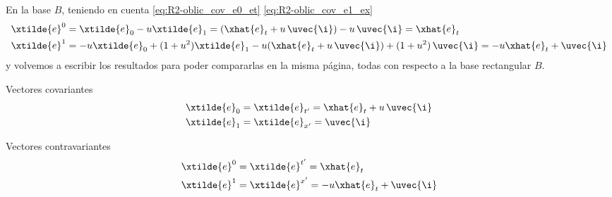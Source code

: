 En la base $B$, teniendo en cuenta \eqref{eq:R2-oblic_cov_e0_et}
\eqref{eq:R2-oblic_cov_e1_ex}
\begin{align}
  \xtilde{e}^0
  &=
    \xtilde{e}_0 - u\xtilde{e}_1
    = (\xhat{e}_t + u\,\uvec{\i}) - u\,\uvec{\i}
    = \xhat{e}_t\\
  \xtilde{e}^1
  &=
    -u\xtilde{e}_0 + (1+u^2)\xtilde{e}_1
    -u (\xhat{e}_t + u\,\uvec{\i}) + (1 + u^2)\,\uvec{\i}
    = -u\xhat{e}_t + \uvec{\i}
\end{align}
y volvemos a escribir los resultados para poder compararlas en la misma página, todas
con respecto a la base rectangular $B$.

Vectores covariantes
\begin{subequations}
\begin{align}
  \xtilde{e}_0 &= \xtilde{e}_{t'} = \xhat{e}_{t} + u\,\uvec{\i}\\
  \xtilde{e}_1 &= \xtilde{e}_{x'} = \uvec{\i}
\end{align}
\end{subequations}

Vectores contravariantes
\begin{subequations}
\begin{align}
  \xtilde{e}^0 &= \xtilde{e}^{t'} = \xhat{e}_t\\
  \xtilde{e}^1 &= \xtilde{e}^{x'} = -u\xhat{e}_t + \uvec{\i}
\end{align}
\end{subequations}


